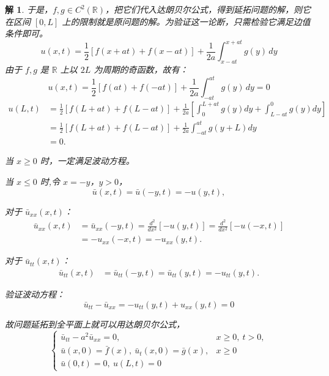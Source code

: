 \documentclass[12pt,a4paper]{article}
\newtheorem*{solution}{解}
\begin{document}
\begin{solution}
	于是，\(f, g \in C^2(\mathbb{R})\)，把它们代入达朗贝尔公式，得到延拓问题的解，则它在区间 \([0, L]\) 上的限制就是原问题的解。为验证这一论断，只需检验它满足边值条件即可。
	\begin{equation*}
		u(x, t) = \frac{1}{2} \left[ f(x + at) + f(x - at) \right] + \frac{1}{2a} \int_{x - at}^{x + at} g(y) \, dy
	\end{equation*}
	由于 \(f, g\) 是 \(\mathbb{R}\) 上以 \(2L\) 为周期的奇函数，故有：
		\begin{equation*}
		u(x, t) = \frac{1}{2} \left[ f( at) + f( - at) \right] + \frac{1}{2a} \int_{ - at}^{ at} g(y) \, dy=0
	\end{equation*}
	\begin{equation*}
		\begin{aligned}
			u(L, t) &= \frac{1}{2}[f(L + at) + f(L - at)] + \frac{1}{2a} \left[ \int_{0}^{L + at} g(y) dy + \int_{L - at}^{0} g(y) dy \right] \\
			&= \frac{1}{2}[f(L + at) + f(L - at)] + \frac{1}{2a} \int_{-at}^{at} g(y + L) dy \\
			&= 0.
		\end{aligned}
	\end{equation*}
	
	当 \(x \geq 0\) 时，一定满足波动方程。
	
	当 \(x \leq 0\) 时,令 \(x = -y\)，\(y > 0\)，
	\[
		\bar{u}(x, t) = \bar{u}(-y, t) = -u(y, t),
	\]
	
	对于 \(\bar{u}_{xx}(x, t)\)：
	\[
	\begin{aligned}
		\bar{u}_{xx}(x, t) &= \bar{u}_{xx}(-y, t) = \frac{d^2}{dx^2} [-u(y, t)] = \frac{d^2}{dx^2} [-u(-x, t)] \\
		&= -u_{xx}(-x, t) = -u_{xx}(y, t).
	\end{aligned}
	\]
	
	对于 \(\bar{u}_{tt}(x, t)\)：
	\[
	\begin{aligned}
		\bar{u}_{tt}(x, t) &= \bar{u}_{tt}(-y, t) = \bar{u}_{tt}(y, t) = -u_{tt}(y, t).
	\end{aligned}
	\]
	
	验证波动方程：
	\[
	\bar{u}_{tt} - \bar{u}_{xx} = -u_{tt}(y, t) + u_{xx}(y, t) = 0
	\]
	
	故问题延拓到全平面上就可以用达朗贝尔公式，
	\begin{equation*}
		\begin{cases}
			\bar{u}_{tt} - a^2 \bar{u}_{xx} = 0, & x \geq  0 , \ t > 0, \\
			\bar{u}(x, 0) = \bar{f}(x), \ \bar{u}_t(x, 0) = \bar{g}(x), & x \geq  0 \\
			\bar{u}(0, t) = 0, \ u(L, t) = 0
		\end{cases}
	\end{equation*}
	

\end{solution}
\end{document}
